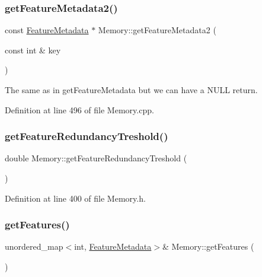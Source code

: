 \subsubsection{\texorpdfstring{get\+Feature\+Metadata2()}{getFeatureMetadata2()}}
{\footnotesize\ttfamily const \hyperlink{class_feature_metadata}{Feature\+Metadata} $\ast$ Memory\+::get\+Feature\+Metadata2 (\begin{DoxyParamCaption}\item[{const int \&}]{key }\end{DoxyParamCaption})}

The same as in get\+Feature\+Metadata but we can have a N\+U\+LL return. 

Definition at line 496 of file Memory.\+cpp.

\mbox{\label{class_memory_a6fe889030e89f7d9e473b1fc276a2def}} 
\subsubsection{\texorpdfstring{get\+Feature\+Redundancy\+Treshold()}{getFeatureRedundancyTreshold()}}
{\footnotesize\ttfamily double Memory\+::get\+Feature\+Redundancy\+Treshold (\begin{DoxyParamCaption}{ }\end{DoxyParamCaption})\hspace{0.3cm}{\ttfamily [inline]}}



Definition at line 400 of file Memory.\+h.

\mbox{\label{class_memory_a0b1d14bfe43af3d3a0353dea8c6eca35}} 
\subsubsection{\texorpdfstring{get\+Features()}{getFeatures()}}
{\footnotesize\ttfamily unordered\+\_\+map$<$int, \hyperlink{class_feature_metadata}{Feature\+Metadata}$>$\& Memory\+::get\+Features (\begin{DoxyParamCaption}{ }\end{DoxyParamCaption})\hspace{0.3cm}{\ttfamily [inline]}}




